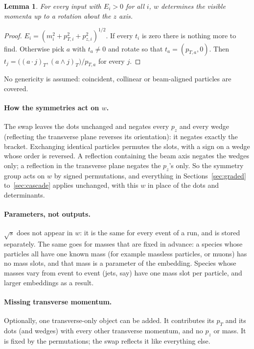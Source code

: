 \documentclass[11pt]{article}
\newtheorem{lemma}{Lemma}
\theoremstyle{definition}
\theoremstyle{remark}
\begin{document}
\begin{lemma}
For every input with $E_i > 0$ for all $i$, $w$ determines the visible momenta up
to a rotation about the $z$ axis.
\end{lemma}
\begin{proof}
$E_i = (m_i^2 + p_{T,i}^2 + p_{z,i}^2)^{1/2}$. If every $t_i$ is zero there is
nothing more to find. Otherwise pick $a$ with $t_a \ne 0$ and rotate so that
$t_a = (p_{T,a}, 0)$. Then $t_j = \bigl((a\cdot j)_T, (a\wedge j)_T\bigr) /
p_{T,a}$ for every $j$.
\end{proof}
No genericity is assumed: coincident, collinear or beam-aligned particles are
covered.

\paragraph{How the symmetries act on $w$.} The swap leaves the dots unchanged
and negates every $p_z$ and every wedge (reflecting the transverse plane
reverses its orientation): it negates exactly the bracket. Exchanging identical
particles permutes the slots, with a sign on a wedge whose order is reversed. A
reflection containing the beam axis negates the wedges only; a reflection in
the transverse plane negates the $p_z$'s only. So the symmetry group acts on
$w$ by signed permutations, and everything in Sections~\ref{sec:graded}
to~\ref{sec:cascade} applies unchanged, with this $w$ in place of the dots and
determinants.

\paragraph{Parameters, not outputs.}
$\sqrt{s}$ does not appear in $w$: it is the same for every event of a run, and
is stored separately. The same goes for masses that are fixed in advance: a
species whose particles all have one known mass (for example massless
particles, or muons) has no mass slots, and that mass is a parameter of the
embedding. Species whose masses vary from event to event (jets, say) have one
mass slot per particle, and larger embeddings as a result.

\paragraph{Missing transverse momentum.} Optionally, one transverse-only object
can be added. It contributes its $p_T$ and its dots (and wedges) with every
other transverse momentum, and no $p_z$ or mass. It is fixed by the
permutations; the swap reflects it like everything else.
\end{document}

